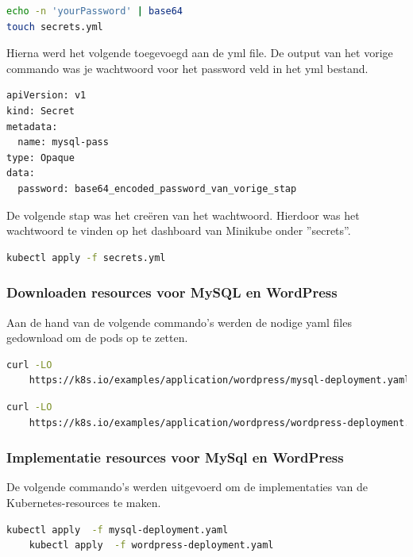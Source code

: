 \begin{lstlisting}[language=bash,caption={aanmaken wachtwoord en secrets.yml}]
echo -n 'yourPassword' | base64   
touch secrets.yml
\end{lstlisting}

Hierna werd het volgende toegevoegd aan de yml file. De output van het vorige commando was je wachtwoord voor het password veld in het yml bestand.

\begin{lstlisting}[language=bash,caption={secrets.yml}]
apiVersion: v1
kind: Secret
metadata:
  name: mysql-pass
type: Opaque
data:
  password: base64_encoded_password_van_vorige_stap
\end{lstlisting}

De volgende stap was het creëren van het wachtwoord. Hierdoor was het wachtwoord te vinden op het dashboard van Minikube onder ''secrets''.

\begin{lstlisting}[language=bash,caption={}]
kubectl apply -f secrets.yml    
\end{lstlisting}
\clearpage
\subsubsection{Downloaden resources voor MySQL en WordPress}

Aan de hand van de volgende commando's werden de nodige yaml files gedownload om de pods op te zetten.

\begin{lstlisting}[language=bash,caption={bestanden MySql}]
    curl -LO 
    https://k8s.io/examples/application/wordpress/mysql-deployment.yaml    
\end{lstlisting}

\begin{lstlisting}[language=bash,caption={bestanden WordPress}]
    curl -LO 
    https://k8s.io/examples/application/wordpress/wordpress-deployment.yaml    
\end{lstlisting}

\subsubsection{Implementatie resources voor MySql en WordPress}

De volgende commando's werden uitgevoerd om de implementaties van de Kubernetes-resources te maken. 

\begin{lstlisting}[language=bash,caption={implementatie}]
    kubectl apply  -f mysql-deployment.yaml
    kubectl apply  -f wordpress-deployment.yaml
\end{lstlisting}

